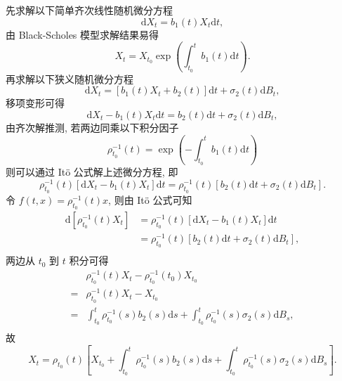 \documentclass[openany]{ctexbook}
\theoremstyle{kaiti}
\theoremstyle{normal}
\begin{document}
先求解以下简单齐次线性随机微分方程
\begin{equation}
  \mathrm{d}X_t=b_1(t) X_t\mathrm{d}t,
\end{equation}
由 Black-Scholes 模型求解结果易得
\begin{equation}
  X_t=X_{t_0}\exp\left(\int_{t_0}^tb_1(t)\mathrm{d}t\right).
\end{equation}
再求解以下狭义随机微分方程
\begin{equation}
  \mathrm{d}X_t=[b_1(t) X_t+b_2(t)]\mathrm{d}t+\sigma_2(t)\mathrm{d}B_t,
\end{equation}
移项变形可得
\begin{equation}
  \mathrm{d}X_t-b_1(t) X_t\mathrm{d}t=b_2(t)\mathrm{d}t+\sigma_2(t)\mathrm{d}B_t,
\end{equation}
由齐次解推测, 若两边同乘以下积分因子
\begin{equation}
  \rho_{t_0}^{-1}(t)=\exp\left(-\int_{t_0}^tb_1(t)\mathrm{d}t\right)
\end{equation}
则可以通过 It\"o 公式解上述微分方程, 即
\begin{equation}
  \rho_{t_0}^{-1}(t)[\mathrm{d}X_t-b_1(t) X_t]\mathrm{d}t=\rho_{t_0}^{-1}(t)[b_2(t)\mathrm{d}t+\sigma_2(t)\mathrm{d}B_t].
\end{equation}
令 $f(t,x)=\rho_{t_0}^{-1}(t)x$, 则由 It\"o 公式可知
\begin{equation}
  \begin{aligned}
  \mathrm{d}\left[\rho_{t_0}^{-1}(t)X_t\right]
  &=\rho_{t_0}^{-1}(t)[\mathrm{d}X_t-b_1(t) X_t]\mathrm{d}t\\
  &=\rho_{t_0}^{-1}(t)[b_2(t)\mathrm{d}t+\sigma_2(t)\mathrm{d}B_t],\\
  \end{aligned}
\end{equation}
两边从 $t_0$ 到 $t$ 积分可得
\begin{equation}
  \begin{aligned}
    &\rho_{t_0}^{-1}(t)X_t-\rho_{t_0}^{-1}(t_0)X_{t_0}\\
    =&\rho_{t_0}^{-1}(t)X_t-X_{t_0}\\
    =&\int_{t_0}^t\rho_{t_0}^{-1}(s)b_2(s)\mathrm{d}s+\int_{t_0}^t\rho_{t_0}^{-1}(s)\sigma_2(s)\mathrm{d}B_s,\\
  \end{aligned}
\end{equation}
故
\begin{equation}
  X_t=\rho_{t_0}(t)\left[X_{t_0}+\int_{t_0}^t\rho_{t_0}^{-1}(s)b_2(s)\mathrm{d}s+\int_{t_0}^t\rho_{t_0}^{-1}(s)\sigma_2(s)\mathrm{d}B_s\right].
\end{equation}
\end{document}
